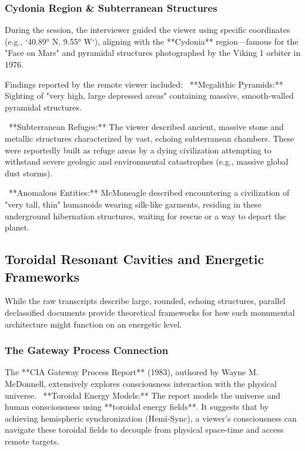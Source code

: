 \documentclass[aps,prd,11pt,onecolumn,superscriptaddress,nofootinbib,floatfix]{revtex4-2}
\begin{document}
\subsubsection{Cydonia Region \& Subterranean Structures}
During the session, the interviewer guided the viewer using specific coordinates (e.g., `40.89° N, 9.55° W`), aligning with the **Cydonia** region---famous for the "Face on Mars" and pyramidal structures photographed by the Viking 1 orbiter in 1976.


Findings reported by the remote viewer included:
\textbullet~**Megalithic Pyramids:** Sighting of "very high, large depressed areas" containing massive, smooth-walled pyramidal structures.

\textbullet~**Subterranean Refuges:** The viewer described ancient, massive stone and metallic structures characterized by vast, echoing subterranean chambers. These were reportedly built as refuge areas by a dying civilization attempting to withstand severe geologic and environmental catastrophes (e.g., massive global dust storms).

\textbullet~**Anomalous Entities:** McMoneagle described encountering a civilization of "very tall, thin" humanoids wearing silk-like garments, residing in these underground hibernation structures, waiting for rescue or a way to depart the planet.



\subsection{Toroidal Resonant Cavities and Energetic Frameworks}
While the raw transcripts describe large, rounded, echoing structures, parallel declassified documents provide theoretical frameworks for how such monumental architecture might function on an energetic level.


\subsubsection{The Gateway Process Connection}
The **CIA Gateway Process Report** (1983), authored by Wayne M. McDonnell, extensively explores consciousness interaction with the physical universe.
\textbullet~**Toroidal Energy Models:** The report models the universe and human consciousness using **toroidal energy fields**. It suggests that by achieving hemispheric synchronization (Hemi-Sync), a viewer's consciousness can navigate these toroidal fields to decouple from physical space-time and access remote targets.
\end{document}
